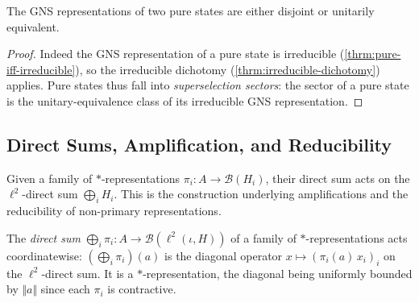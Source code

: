 \begin{theorem}
    \label{thrm:pure-state-dichotomy}
    \leanok
    The GNS representations of two pure states are either disjoint or unitarily equivalent.
\end{theorem}
\begin{proof}
    \leanok
    Indeed the GNS representation of a pure state is irreducible (\ref{thrm:pure-iff-irreducible}), so the irreducible dichotomy (\ref{thrm:irreducible-dichotomy}) applies. Pure states thus fall into \emph{superselection sectors}: the sector of a pure state is the unitary-equivalence class of its irreducible GNS representation.
\end{proof}

\subsection{Direct Sums, Amplification, and Reducibility}

Given a family of $*$-representations $\pi_i : A \to \mathcal{B}(H_i)$, their direct sum acts on the $\ell^2$-direct sum $\bigoplus_i H_i$. This is the construction underlying amplifications and the reducibility of non-primary representations.

\begin{definition}
    \label{def:direct-sum-representation}
    \leanok
    The \emph{direct sum} $\bigoplus_i \pi_i : A \to \mathcal{B}(\ell^2(\iota, H))$ of a family of $*$-representations acts coordinatewise: $(\bigoplus_i \pi_i)(a)$ is the diagonal operator $x \mapsto (\pi_i(a)\,x_i)_i$ on the $\ell^2$-direct sum. It is a $*$-representation, the diagonal being uniformly bounded by $\Vert a\Vert$ since each $\pi_i$ is contractive.
\end{definition}

